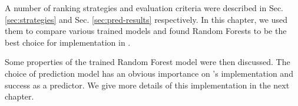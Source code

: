 A number of ranking strategies and evaluation criteria were described in Sec. \ref{sec:strategies} and Sec. \ref{sec:pred-results} respectively.
In this chapter, we used them to compare various trained models and found Random Forests to be the best choice for implementation in \where.

Some properties of the trained Random Forest model were then discussed.
The choice of prediction model has an obvious importance on \where's  implementation and success as a predictor. 
We give more details of this implementation in the next chapter.  



